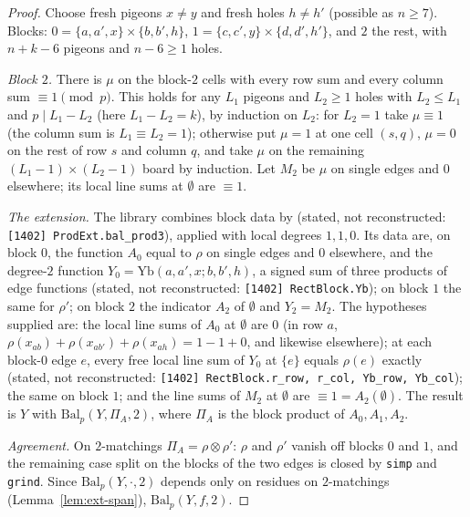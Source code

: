 \begin{proof}
Choose fresh pigeons $x\ne y$ and fresh holes $h\ne h'$ (possible as $n\ge7$).
Blocks: $0=\{a,a',x\}\times\{b,b',h\}$, $1=\{c,c',y\}\times\{d,d',h'\}$, and $2$ the rest, with
$n+k-6$ pigeons and $n-6\ge1$ holes.

\emph{Block $2$.}  There is $\mu$ on the block-$2$ cells with every row sum and every column sum
$\equiv1\pmod p$.  This holds for any $L_1$ pigeons and $L_2\ge1$ holes with $L_2\le L_1$ and
$p\mid L_1-L_2$ (here $L_1-L_2=k$), by induction on $L_2$: for $L_2=1$ take $\mu\equiv1$
(the column sum is $L_1\equiv L_2=1$); otherwise put $\mu=1$ at one cell $(s,q)$, $\mu=0$ on
the rest of row $s$ and column $q$, and take $\mu$ on the remaining $(L_1-1)\times(L_2-1)$
board by induction.  Let $M_2$ be $\mu$ on single edges and $0$
elsewhere; its local line sums at $\emptyset$ are $\equiv1$.

\emph{The extension.}  The library combines block data by (stated, not reconstructed:
\texttt{[1402] ProdExt.bal\_prod3}), applied with local degrees $1,1,0$.  Its data are, on
block $0$, the function $A_0$ equal to $\rho$ on single edges and $0$ elsewhere, and the
degree-$2$ function $Y_0=\mathrm{Yb}(a,a',x;b,b',h)$, a signed sum of three products of edge
functions (stated, not reconstructed: \texttt{[1402] RectBlock.Yb}); on block $1$ the same
for $\rho'$; on block $2$ the indicator $A_2$ of $\emptyset$ and $Y_2=M_2$.  The hypotheses
supplied are: the local line sums of $A_0$ at $\emptyset$ are $0$ (in row $a$,
$\rho(x_{ab})+\rho(x_{ab'})+\rho(x_{ah})=1-1+0$, and likewise elsewhere); at each block-$0$
edge $e$, every free local line sum of $Y_0$ at $\{e\}$ equals $\rho(e)$ exactly (stated, not
reconstructed: \texttt{[1402] RectBlock.r\_row, r\_col, Yb\_row, Yb\_col}); the same on block
$1$; and the line sums of $M_2$ at $\emptyset$ are $\equiv1=A_2(\emptyset)$.  The result is $Y$
with $\mathrm{Bal}_p(Y,\Pi_A,2)$, where $\Pi_A$ is the block product of $A_0,A_1,A_2$.

\emph{Agreement.}  On $2$-matchings $\Pi_A=\rho\otimes\rho'$: $\rho$ and $\rho'$ vanish off
blocks $0$ and $1$, and the remaining case split on the blocks of the two edges is closed by
\texttt{simp} and \texttt{grind}.  Since
$\mathrm{Bal}_p(Y,\cdot,2)$ depends only on residues on $2$-matchings
(Lemma~\ref{lem:ext-span}), $\mathrm{Bal}_p(Y,f,2)$.
\end{proof}

